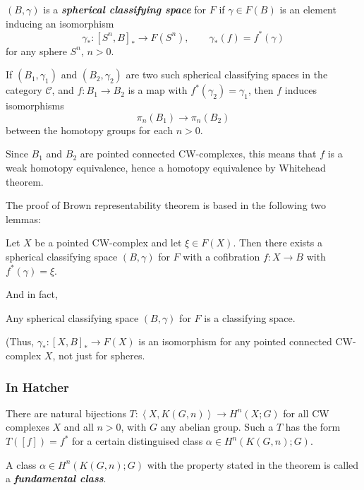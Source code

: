 \begin{defn}
	$(B,\gamma)$ is a \textit{\textbf{spherical classifying space}} for $F$ if $\gamma\in F(B)$ is an element inducing an isomorphism
	\[\gamma_{*}:[S^{n},B]_{*}\to F(S^{n}),\qquad \gamma_{*}(f)=f^{*} (\gamma)\]
	for any sphere $S^{n}$, $n>0$.
\end{defn}

\begin{remark}
	If $(B_{1},\gamma_{1})$ and $(B_{2},\gamma_{2})$ are two such spherical classifying spaces in the category $\mathcal{C}$, and $f:B_{1}\to B_{2}$ is a map with $f^{*} (\gamma_{2})=\gamma_{1}$, then $f$ induces isomorphisms
	\[\pi_{n}(B_{1})\to \pi_{n}(B_{2})\]
	between the homotopy groups for each $n>0$.

	Since $B_{1}$ and $B_{2}$ are pointed connected CW-complexes, this means that $f$ is a weak homotopy equivalence, hence a homotopy equivalence by Whitehead theorem.
\end{remark}

The proof of Brown representability theorem is based in the following two lemmas:

\begin{lemma}
	Let $X$ be a pointed CW-complex and let $\xi \in F(X)$. Then there exists a spherical classifying space $(B,\gamma)$ for $F$ with a cofibration  $f:X\to B$ with $f^{*} (\gamma)=\xi$.
\end{lemma}

And in fact,

\begin{lemma}
	Any spherical classifying space $(B,\gamma)$ for $F$ is a classifying space.

	(Thus, $\gamma_{*}:[X,B]_{*}\to F(X)$ is an isomorphism for any pointed connected CW-complex $X$, not just for spheres.
\end{lemma}

\subsubsection{In Hatcher}

\begin{thm}[4.57]
	There are natural bijections $T:\left<X,K(G,n) \right> \to H^{n}(X;G)$ for all CW complexes $X$ and all $n>0$, with $G$ any abelian group. Such a $T$ has the form $T([f])=f^{*}$ for a certain distinguised class $\alpha\in H^{n}(K(G,n);G)$.
\end{thm}

\begin{defn}
	A class $\alpha\in H^{n}(K(G,n);G)$ with the property stated in the theorem is called a \textit{\textbf{fundamental class}}.
\end{defn}


